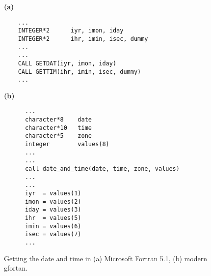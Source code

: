 \begin{supplement}
\begin{figure}[h]
\begin{minipage}{0.75\textwidth}
\textbf{(a)}

\begin{lstlisting}
    ...
    INTEGER*2      iyr, imon, iday
    INTEGER*2      ihr, imin, isec, dummy
    ...
    ...
    CALL GETDAT(iyr, imon, iday)
    CALL GETTIM(ihr, imin, isec, dummy)
    ...

\end{lstlisting}
\end{minipage}
%
\hfill
%
\begin{minipage}{0.75\textwidth}
\textbf{(b)}
\begin{lstlisting}
      ...
      character*8    date
      character*10   time
      character*5    zone
      integer        values(8)
      ...
      ...
      call date_and_time(date, time, zone, values)
      ...
      ...
      iyr  = values(1)
      imon = values(2)
      iday = values(3)
      ihr  = values(5)
      imin = values(6)
      isec = values(7)
      ...

\end{lstlisting}
\end{minipage}

\caption{Getting the date and time in (a) Microsoft Fortran 5.1, (b) modern gfortan.}
\label{fig:date-time}
\end{figure}


\end{supplement}

